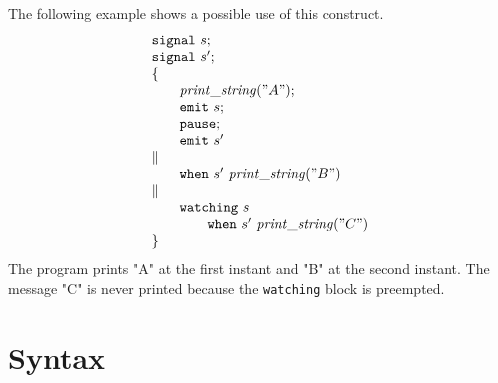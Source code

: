 \documentclass[12pt]{article}
\def\signal{{\tt{signal}}}
\def\emit{{\tt{emit}}}
\newcommand{\when}[2]{{\tt{when}}~#1~#2}
\newcommand{\watching}[2]{{\tt{watching}}~#1~#2}
\begin{document}
The following example shows a possible use of this construct.
$$
\begin{array}{l}
  \signal~s;\\
  \signal~s';\\
  \{\\
  \qquad {\mathit{print\_string}}("A");\\
  \qquad \emit~s;\\
  \qquad {\tt{pause}};\\
  \qquad \emit~s'\\
  \parallel \\
  \qquad \when{s'}{{\mathit{print\_string}}("B")}\\
  \parallel\\
  \qquad \watching{s}{\\\qquad\qquad\when{s'}{{\mathit{print\_string}}("C")}}\\
  \}
\end{array}
$$
The program prints "A" at the first instant and "B" at the second instant. The message "C" is never printed 
because the {\tt{watching}} block is preempted.

\section{Syntax}
\end{document}
